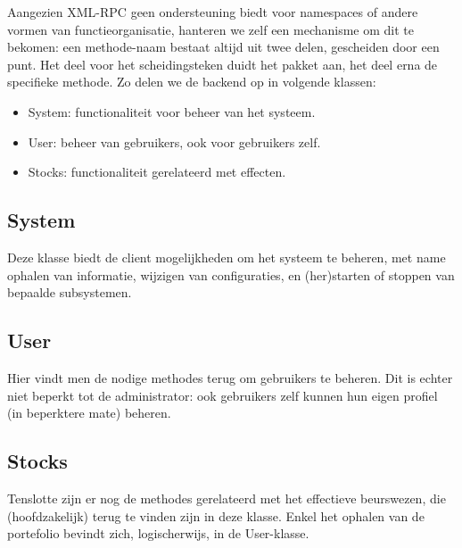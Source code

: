 Aangezien XML-RPC geen ondersteuning biedt voor namespaces of andere vormen van functieorganisatie, hanteren we zelf een mechanisme om dit te bekomen: een methode-naam bestaat altijd uit twee delen, gescheiden door een punt. Het deel voor het scheidingsteken duidt het pakket aan, het deel erna de specifieke methode.
Zo delen we de backend op in volgende klassen:
\begin{itemize}
\item{System: functionaliteit voor beheer van het systeem.}
\item{User: beheer van gebruikers, ook voor gebruikers zelf.}
\item{Stocks: functionaliteit gerelateerd met effecten.}
\end{itemize}

\subsection{System}

Deze klasse biedt de client mogelijkheden om het systeem te beheren, met name ophalen van informatie, wijzigen van configuraties, en (her)starten of stoppen van bepaalde subsystemen.

\subsection{User}

Hier vindt men de nodige methodes terug om gebruikers te beheren. Dit is echter niet beperkt tot de administrator: ook gebruikers zelf kunnen hun eigen profiel (in beperktere mate) beheren.

\subsection{Stocks}

Tenslotte zijn er nog de methodes gerelateerd met het effectieve beurswezen, die (hoofdzakelijk) terug te vinden zijn in deze klasse. Enkel het ophalen van de portefolio bevindt zich, logischerwijs, in de User-klasse.
